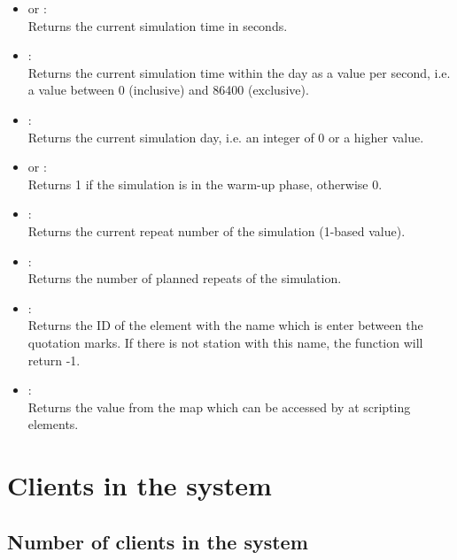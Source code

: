 \begin{itemize}

\item
{} or :\\
Returns the current simulation time in seconds.

\item
{}:\\
Returns the current simulation time within the day as a value per second, i.e. a value between 0 (inclusive) and 86400 (exclusive).

\item
{}:\\
Returns the current simulation day, i.e. an integer of 0 or a higher value.

\item
{} or :\\
Returns 1 if the simulation is in the warm-up phase, otherwise 0.

\item
{}:\\
Returns the current repeat number of the simulation (1-based value).

\item
{}:\\
Returns the number of planned repeats of the simulation.

\item
{}:\\
Returns the ID of the element with the name which is enter between the quotation marks.
If there is not station with this name, the function will return -1.

\item
{}:\\
Returns the value from the map which can be accessed by  at scripting elements.

\end{itemize}





\section{Clients in the system}



\subsection{Number of clients in the system}

